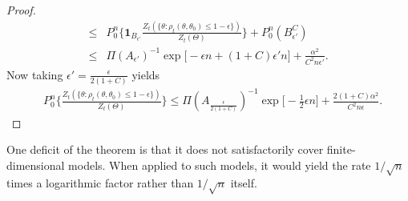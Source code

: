 \documentclass[11pt, letterpaper]{article}
\theoremstyle{plain}
\theoremstyle{definition}
\theoremstyle{remark}
\begin{document}
\begin{proof}
$$\begin{aligned}
         \leq&P_0^n \Big\{ \mathbf{1}_{B_{\epsilon'}}
             \frac{Z_t ( \{\theta:\rho_{t}(\theta,\theta_0)\leq 1- \epsilon\} )}{Z_t(\Theta)}
         \Big\}+P_0^n (B_{\epsilon'}^C)\\
         \leq& {\Pi(A_{\epsilon'})}^{-1}\exp \big[-\epsilon n+(1+C)\epsilon' n\big] +\frac{\alpha^2}{C^2n\epsilon'}.
     \end{aligned}
     $$
     Now taking $\epsilon'=\frac{\epsilon}{2(1+C)}$ yields
     $$
     \begin{aligned}
         &P_0^n \Big\{
             \frac{Z_t ( \{\theta:\rho_{t}(\theta,\theta_0)\leq 1- \epsilon\} )}{Z_t(\Theta)}
\Big\}
         \leq {\Pi(A_{\frac{\epsilon}{2(1+C)}})}^{-1}\exp \big[-\frac{1}{2}\epsilon n\big] +\frac{2(1+C)\alpha^2}{C^2n\epsilon}.
     \end{aligned}
     $$
\end{proof}


One deficit of the theorem is that it does not satisfactorily cover finite-dimensional models.
When applied to such models, it would yield the rate $1/\sqrt{n}$ times a logarithmic factor rather than $1/\sqrt{n}$ itself.
\end{document}
